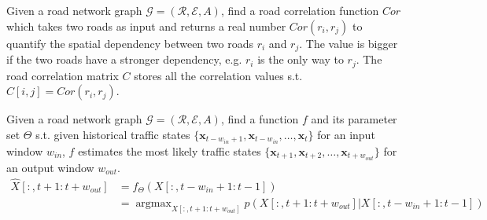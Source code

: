 \begin{problem}
    Given a road network graph $\mathcal{G}=(\mathcal{R}, \mathcal{E}, A)$, find a road correlation function $Cor$ which takes two roads as input and returns a real number $Cor(r_i, r_j)$ to quantify the spatial dependency between two roads $r_i$ and $r_j$. The value is bigger if the two roads have a stronger dependency, e.g. $r_i$ is the only way to $r_j$. The road correlation matrix $C$ stores all the correlation values s.t. $C[i, j]=Cor(r_i, r_j)$.
\end{problem}

\begin{problem}
    Given a road network graph $\mathcal{G}=(\mathcal{R}, \mathcal{E}, A)$, find a function $f$ and its parameter set $\Theta$ s.t. given historical traffic states $\{\mathbf{x}_{t-w_{in}+1}, \mathbf{x}_{t-w_{in}}, \dots, \mathbf{x}_t \}$ for an input window $w_{in}$, $f$ estimates the most likely traffic states $\{\mathbf{x}_{t+1}, \mathbf{x}_{t+2}, \dots, \mathbf{x}_{t+w_{out}} \}$ for an output window $w_{out}$.
    \begin{equation}
        \begin{aligned}
            \hat X[:, t+1{:}t+w_{out}]&=f_\Theta(X[:, t-w_{in}+1{:}t-1])\\&=\mathop{\arg\max}_{X[:, t+1{:}t+w_{out}]} p(X[:, t+1{:}t+w_{out}]|X[:, t-w_{in}+1{:}t-1])
        \end{aligned}
    \end{equation}
\end{problem}
